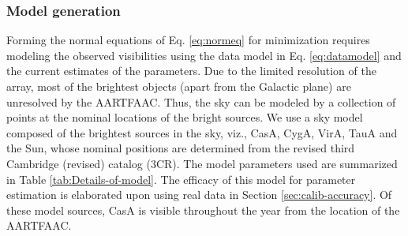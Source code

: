 \documentclass{aa}
\begin{document}
\subsubsection{\label{sub:Model-generation}Model generation}
\begin{table}[tbh]
\caption{Details of model sources (the A-team) used for All-sky self-calibration}
\label{tab:Details-of-model}
\end{table}

Forming the  normal equations of  Eq. \ref{eq:normeq} for  minimization requires
modeling    the    observed   visibilities    using    the    data   model    in
Eq. \ref{eq:datamodel} and the current  estimates of the parameters.  Due to the
limited resolution of  the array, most of the brightest  objects (apart from the
Galactic plane) are unresolved by the AARTFAAC.  Thus, the sky can be modeled by
a collection of points at the nominal  locations of the bright sources. We use a
sky model composed of the brightest  sources in the sky, viz., CasA, CygA, VirA,
TauA and the Sun, whose nominal  positions are determined from the revised third
Cambridge (revised) catalog (3CR).  The  model parameters used are summarized in
Table  \ref{tab:Details-of-model}.  The  efficacy  of this  model for  parameter
estimation    is    elaborated    upon    using    real    data    in    Section
\ref{sec:calib-accuracy}.  Of  these model  sources, CasA is  visible throughout
the year from the location of the AARTFAAC.
\end{document}
